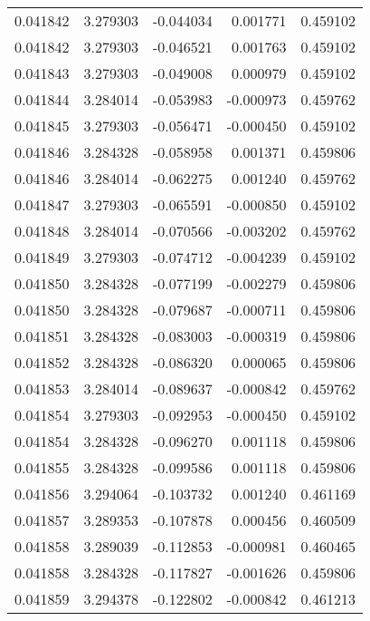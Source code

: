 \begin{tabular}{lrrrr}
0.041842    &  3.279303 & -0.044034 &  0.001771 &             0.459102 \\
0.041842    &  3.279303 & -0.046521 &  0.001763 &             0.459102 \\
0.041843    &  3.279303 & -0.049008 &  0.000979 &             0.459102 \\
0.041844    &  3.284014 & -0.053983 & -0.000973 &             0.459762 \\
0.041845    &  3.279303 & -0.056471 & -0.000450 &             0.459102 \\
0.041846    &  3.284328 & -0.058958 &  0.001371 &             0.459806 \\
0.041846    &  3.284014 & -0.062275 &  0.001240 &             0.459762 \\
0.041847    &  3.279303 & -0.065591 & -0.000850 &             0.459102 \\
0.041848    &  3.284014 & -0.070566 & -0.003202 &             0.459762 \\
0.041849    &  3.279303 & -0.074712 & -0.004239 &             0.459102 \\
0.041850    &  3.284328 & -0.077199 & -0.002279 &             0.459806 \\
0.041850    &  3.284328 & -0.079687 & -0.000711 &             0.459806 \\
0.041851    &  3.284328 & -0.083003 & -0.000319 &             0.459806 \\
0.041852    &  3.284328 & -0.086320 &  0.000065 &             0.459806 \\
0.041853    &  3.284014 & -0.089637 & -0.000842 &             0.459762 \\
0.041854    &  3.279303 & -0.092953 & -0.000450 &             0.459102 \\
0.041854    &  3.284328 & -0.096270 &  0.001118 &             0.459806 \\
0.041855    &  3.284328 & -0.099586 &  0.001118 &             0.459806 \\
0.041856    &  3.294064 & -0.103732 &  0.001240 &             0.461169 \\
0.041857    &  3.289353 & -0.107878 &  0.000456 &             0.460509 \\
0.041858    &  3.289039 & -0.112853 & -0.000981 &             0.460465 \\
0.041858    &  3.284328 & -0.117827 & -0.001626 &             0.459806 \\
0.041859    &  3.294378 & -0.122802 & -0.000842 &             0.461213 \\

\end{tabular}
